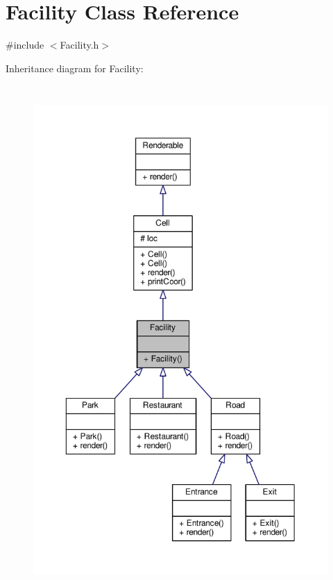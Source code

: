 \hypertarget{classFacility}{}\section{Facility Class Reference}
\label{classFacility}


{\ttfamily \#include $<$Facility.\+h$>$}



Inheritance diagram for Facility\+:
\nopagebreak
\begin{figure}[H]
\begin{center}
\leavevmode
\includegraphics[height=550pt]{classFacility__inherit__graph}
\end{center}
\end{figure}


